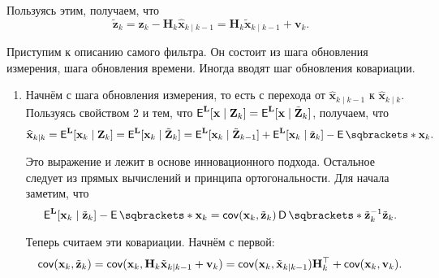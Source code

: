 Пользуясь этим, получаем, что
\[
	\tilde{\mathbf{z}}_{k} = \mathbf{z}_{k} - \mathbf{H}_{k} 
	\hat{\mathbf{x}}_{k \mid k - 1} = \mathbf{H}_{k} 
	\tilde{\mathbf{x}}_{k \mid k - 1} + \mathbf{v}_{k}.
\]

Приступим к описанию самого фильтра. Он состоит из шага обновления измерения, 
шага обновления времени. Иногда вводят шаг обновления ковариации. 
\begin{enumerate}
	\item Начнём с шага обновления измерения, то есть с перехода от 
	\(\hat{\mathbf{x}}_{k \mid k - 1}\) к \(\hat{\mathbf{x}}_{k \mid k}\). 
	Пользуясь свойством 2 и тем, что 
	\(\E^{\mathbf{L}}[\mathbf{x} \mid \mathbf{Z}_{k}] = \E^{\mathbf{L}} 
	[\mathbf{x} \mid \tilde{\mathbf{Z}}_{k}]\), получаем, что
	\[
		\hat{\mathbf{x}}_{k \mid k} = \E^{\mathbf{L}}[\mathbf{x}_{k} \mid 
		\mathbf{Z}_{k}] = \E^{\mathbf{L}}[\mathbf{x}_{k} \mid 
		\tilde{\mathbf{Z}}_{k}] = \E^{\mathbf{L}}[\mathbf{x}_{k} \mid 
		\tilde{\mathbf{Z}}_{k - 1}] + \E^{\mathbf{L}}[\mathbf{x}_{k} \mid 
		\tilde{\mathbf{z}}_{k}] - \E{\mathbf{x}_{k}}.
	\]
	
	Это выражение и лежит в основе инновационного подхода. Остальное следует из 
	прямых вычислений и принципа ортогональности. Для начала заметим, что
	\[
		\E^{\mathbf{L}}[\mathbf{x}_{k} \mid \tilde{\mathbf{z}}_{k}] - 
		\E{\mathbf{x}_{k}} = \cov(\mathbf{x}_{k}, \tilde{\mathbf{z}}_{k}) 
		\D{\tilde{\mathbf{z}}_{k}}^{-1}\tilde{\mathbf{z}}_{k}.
	\]
	
	Теперь считаем эти ковариации. Начнём с первой:
	\[
		\operatorname{\mathsf{cov}}(\mathbf{x}_{k}, \tilde{\mathbf{z}}_{k}) = \operatorname{\mathsf{cov}}(\mathbf{x}_{k}, 
		\mathbf{H}_{k} \tilde{\mathbf{x}}_{k \mid k - 1} + \mathbf{v}_{k}) = 
		\operatorname{\mathsf{cov}}(\mathbf{x}_{k}, \tilde{\mathbf{x}}_{k \mid k - 1}) 
		\mathbf{H}_{k}^{\top} + \operatorname{\mathsf{cov}}(\mathbf{x}_{k}, \mathbf{v}_{k}).
	\]
	

\end{enumerate}
